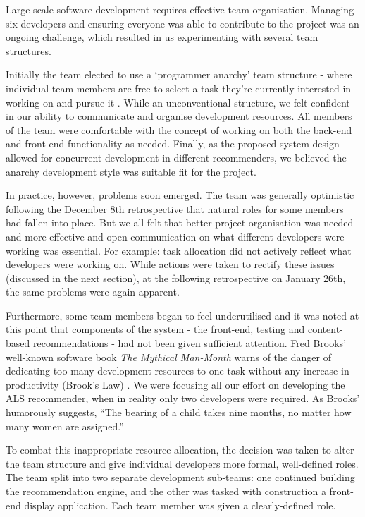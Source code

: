 \documentclass{l3proj}
\begin{document}
Large-scale software development requires effective team organisation. Managing six developers and ensuring everyone was able to contribute to the project was an ongoing challenge, which resulted in us experimenting with several team structures.

Initially the team elected to use a `programmer anarchy' team structure - where individual team members are free to select a task they’re currently interested in working on and pursue it \cite{ProgrammerAnarchy}. While an unconventional structure, we felt confident in our ability to communicate and organise development resources. All members of the team were comfortable with the concept of working on both the back-end and front-end functionality as needed. Finally, as the proposed system design allowed for concurrent development in different recommenders, we believed the anarchy development style was suitable fit for the project. 

In practice, however, problems soon emerged. The team was generally optimistic following the December 8th retrospective that natural roles for some members had fallen into place. But we all felt that better project organisation was needed and more effective and open communication on what different developers were working was essential. For example: task allocation did not actively reflect what developers were working on. While actions were taken to rectify these issues (discussed in the next section), at the following retrospective on January 26th, the same problems were again apparent. 

Furthermore, some team members began to feel underutilised and it was noted at this point that components of the system - the front-end, testing and content-based recommendations - had not been given sufficient attention. Fred Brooks' well-known software book \textit{The Mythical Man-Month} warns of the danger of dedicating too many development resources to one task without any increase in productivity (Brook’s Law) \cite{ManMonth}. We were focusing all our effort on developing the ALS recommender, when in reality only two developers were required. As Brooks’ humorously suggests, “The bearing of a child takes nine months, no matter how many women are assigned.”

To combat this inappropriate resource allocation, the decision was taken to alter the team structure and give individual developers more formal, well-defined roles. The team split into two separate development sub-teams: one continued building the recommendation engine, and the other was tasked with construction a front-end display application. Each team member was given a clearly-defined role. 
\end{document}
